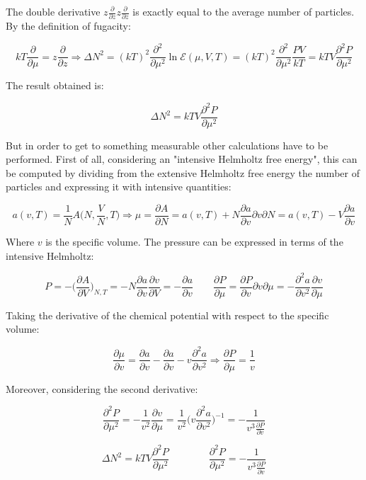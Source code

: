 The double derivative $z\frac{\partial}{\partial z}z\frac{\partial}{\partial z}$ is exactly equal to the average number of particles.
By the definition of fugacity:

$$kT\frac{\partial}{\partial\mu} = z\frac{\partial}{\partial z}\Rightarrow\Delta N^2 = (kT)^2\frac{\partial^2}{\partial\mu^2}\ln\mathcal{E}(\mu, V, T) = (kT)^2\frac{\partial^2}{\partial\mu^2}\frac{PV}{kT} = kTV\frac{\partial^2 P}{\partial\mu^2}$$

The result obtained is:

$$\Delta N^2 = kTV\frac{\partial^2 P}{\partial \mu^2}$$

But in order to get to something measurable other calculations have to be performed.
First of all, considering an "intensive Helmholtz free energy", this can be computed by dividing from the extensive Helmholtz free energy the number of particles and expressing it with intensive quantities:

$$a(v, T) = \frac{1}{N}A\biggl(N, \frac{V}{N}, T\biggr) \Rightarrow \mu = \frac{\partial A}{\partial N} = a(v, T) + N\frac{\partial a}{\partial v}{\partial v}{\partial N} = a(v, T) - V\frac{\partial a}{\partial v}$$

Where $v$ is the specific volume.
The pressure can be expressed in terms of the intensive Helmholtz:

$$P = -\biggl(\frac{\partial A}{\partial V}\biggr)_{N, T} = -N\frac{\partial a}{\partial v}\frac{\partial v}{\partial V} = -\frac{\partial a}{\partial v}\qquad\frac{\partial P}{\partial\mu} = \frac{\partial P}{\partial  v}{\partial v}{\partial\mu} = -\frac{\partial^2 a}{\partial v^2}\frac{\partial v}{\partial \mu}$$

Taking the derivative of the chemical potential with respect to the specific volume:

$$\frac{\partial\mu}{\partial v} = \frac{\partial a}{\partial v}-\frac{\partial a}{\partial v} - v \frac{\partial^2a}{\partial v^2}\Rightarrow \frac{\partial P}{\partial\mu} = \frac{1}{v}$$

Moreover, considering the second derivative:

$$\frac{\partial^2P}{\partial\mu^2} = -\frac{1}{v^2}\frac{\partial v}{\partial\mu} = \frac{1}{v^2}\biggl(v\frac{\partial^2 a}{\partial v^2}\biggr)^{-1} = -\frac{1}{v^3\frac{\partial P}{\partial v}}$$

$$\Delta N^2 = kTV\frac{\partial^2 P}{\partial\mu^2}\qquad\qquad\frac{\partial^2 P}{\partial\mu^2} = -\frac{1}{v^3\frac{\partial P}{\partial v}}$$

